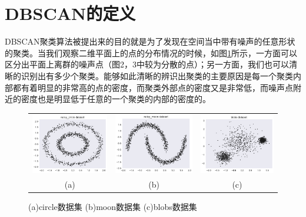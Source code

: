 \documentclass[UTF8, 12pt]{ctexart}
\begin{document}
\section{DBSCAN的定义}
DBSCAN聚类算法被提出来的目的就是为了发现在空间当中带有噪声的任意形状的聚类。当我们观察二维平面上的点的分布情况的时候，如图\ref{Fig:1}所示，一方面可以区分出平面上离群的噪声点（图2，3中较为分散的点）；另一方面，我们也可以清晰的识别出有多少个聚类。能够如此清晰的辨识出聚类的主要原因是每一个聚类内部都有着明显的非常高的点的密度，而聚类外部点的密度又是非常低，而噪声点附近的密度也是明显低于任意的一个聚类的内部的密度的。
\begin{figure}[H]
	\centering
	\begin{tabular}{ccc}
		\includegraphics[width=0.29\linewidth]{..//Plots//noisy_circleDataset.pdf}  & 
		\includegraphics[width=0.29\linewidth]{..//Plots//noisy_moonDataset.pdf} &
		\includegraphics[width=0.29\linewidth]{..//Plots//blobsDataset.pdf} \\
		(a) & (b) & (c)\\
	\end{tabular}
	\caption{(a)circle数据集 (b)moon数据集 (c)blobs数据集}
	\label{Fig:1}
	\vspace{-0.5em}
\end{figure}
\end{document}
